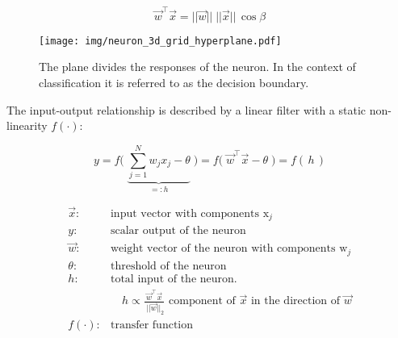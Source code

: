 \begin{frame}
{    \svspace{-3mm}
    
    \begin{equation}
    \vec w^\top\vec x = ||\vec w||\;||\vec x||\,\cos{\beta}
    \end{equation}
    
    }
   
\end{frame}
\begin{frame}
    
    \begin{figure}[h]
        \centering
        \texttt{[image: img/neuron\_3d\_grid\_hyperplane.pdf]}
        \caption{The plane divides the responses of the neuron. In the context of classification it is referred to as the decision boundary.}
        \label{fig:neuron_3d_grid_hyperplane}
    \end{figure}
    
\end{frame}
\begin{frame}
    
    The input-output relationship is described by a linear filter with a static non-linearity $f(\cdot)$:

    \begin{equation}
        \label{eq:linearNeuron}
        y = f \Big(\; \underbrace{\sum_{j=1}^{N} {w}_{j} 
            {x}_j - \theta}_{=:h} \; \Big)
            = f \big(\;  \vec{w}^{\top}
            \vec{x}- \theta \; \big)
            = f(\,h\,)
    \end{equation}
    
	\[ \begin{array}{ll} 
		\vec{x}: & \text{input vector with components } \mathrm{x}_j \\
		y: & \text{scalar output of the neuron } \\
		\vec{w}: & \text{weight vector of the neuron with components }
			\mathrm{w}_{j}\\
		\theta: & \text{threshold of the neuron} \\
		h: & \text{total input of the neuron. } \\
		&\quad h \propto \frac{\vec w^\top \vec x}{\;||\vec w||_2} \text{ component of $\vec x$ in the direction of $\vec w$}\\
		f(\cdot): & \text{transfer function}
	\end{array} \]
    
\end{frame}

